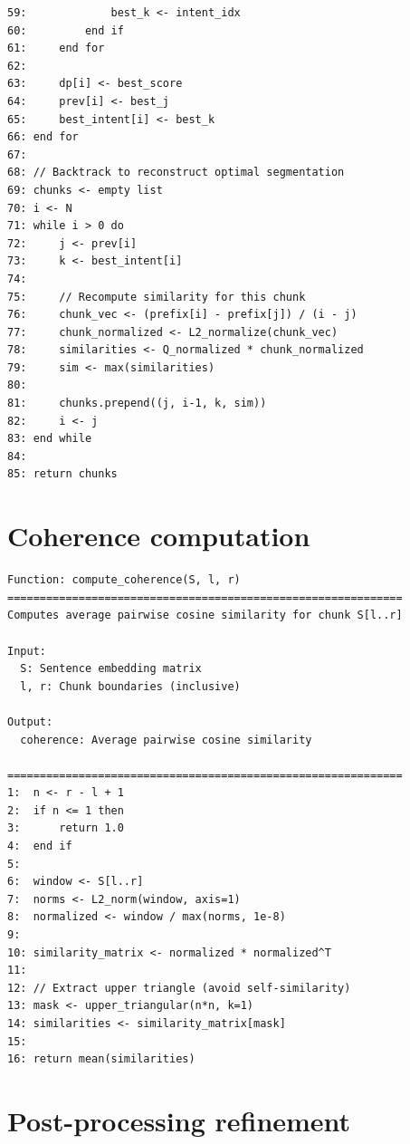\documentclass[12pt,a4paper]{report}
\begin{document}
\begin{verbatim}
59:             best_k <- intent_idx
60:         end if
61:     end for
62:     
63:     dp[i] <- best_score
64:     prev[i] <- best_j
65:     best_intent[i] <- best_k
66: end for
67:
68: // Backtrack to reconstruct optimal segmentation
69: chunks <- empty list
70: i <- N
71: while i > 0 do
72:     j <- prev[i]
73:     k <- best_intent[i]
74:     
75:     // Recompute similarity for this chunk
76:     chunk_vec <- (prefix[i] - prefix[j]) / (i - j)
77:     chunk_normalized <- L2_normalize(chunk_vec)
78:     similarities <- Q_normalized * chunk_normalized
79:     sim <- max(similarities)
80:     
81:     chunks.prepend((j, i-1, k, sim))
82:     i <- j
83: end while
84:
85: return chunks
\end{verbatim}

\section{Coherence computation}

\begin{verbatim}
Function: compute_coherence(S, l, r)
=============================================================
Computes average pairwise cosine similarity for chunk S[l..r]

Input:
  S: Sentence embedding matrix
  l, r: Chunk boundaries (inclusive)
  
Output:
  coherence: Average pairwise cosine similarity

=============================================================
1:  n <- r - l + 1
2:  if n <= 1 then
3:      return 1.0
4:  end if
5:
6:  window <- S[l..r]
7:  norms <- L2_norm(window, axis=1)
8:  normalized <- window / max(norms, 1e-8)
9:  
10: similarity_matrix <- normalized * normalized^T
11: 
12: // Extract upper triangle (avoid self-similarity)
13: mask <- upper_triangular(n*n, k=1)
14: similarities <- similarity_matrix[mask]
15: 
16: return mean(similarities)
\end{verbatim}

\section{Post-processing refinement}
\end{document}
